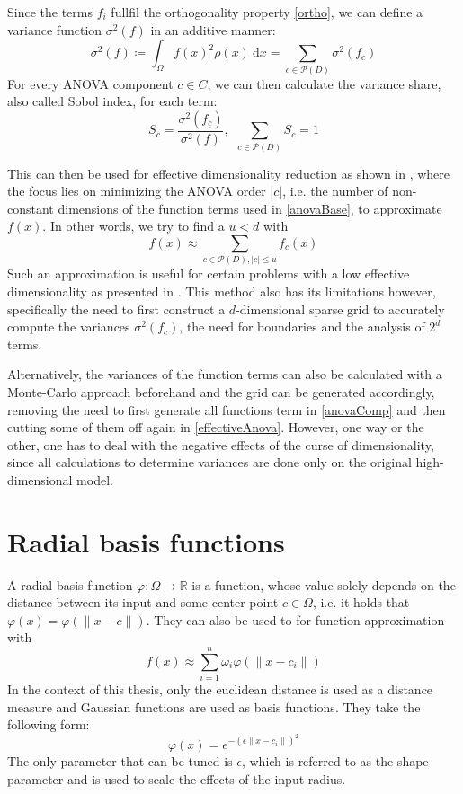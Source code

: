 \documentclass[
  a4paper,  %
  twoside,  %
  bibliography=totoc,
  headsepline,
  cleardoublepage=empty,
  parskip=half,
  draft=false
]{scrbook}
\begin{document}
Since the terms $f_i$ fullfil the orthogonality property \eqref{ortho}, we can define a variance function $\sigma^2(f)$ in an additive manner:
\begin{equation}
\sigma^2(f) \coloneqq \int_{\Omega} f(x)^2 \rho(x) ~ \text{d} x=\sum_{c \in \mathcal{P}(D)} \sigma^2(f_c)
\end{equation}
For every ANOVA component $c \in C$, we can then calculate the variance share, also called Sobol index, for each term:
\begin{equation}
S_{c}=\frac{\sigma^2(f_{\underline{c}} )}{\sigma^2(f)}, ~~ \sum_{c \in \mathcal{P}(D)} S_{c} = 1
\nonumber
\end{equation}

This can then be used for effective dimensionality reduction as shown in \cite{G13,F10}, where the focus lies on minimizing the ANOVA order $|c|$, i.e. the number of non-constant dimensions of the function terms used in \eqref{anovaBase}, to approximate $f(x)$.
In other words, we try to find a $u < d$ with
\begin{equation}
f(x) \approx \sum_{c \in \mathcal{P}(D), |c| \leq u} f_c(x)
\label{effectiveAnova}
\end{equation}
Such an approximation is useful for certain problems with a low effective dimensionality as presented in \cite{H08}.
This method also has its limitations however, specifically the need to first construct a $d$-dimensional sparse grid to accurately compute the variances $\sigma^2(f_c)$, the need for boundaries and the analysis of $2^d$ terms.

Alternatively, the variances of the function terms can also be calculated with a Monte-Carlo approach \cite{} beforehand and the grid can be generated accordingly, removing the need to first generate all functions term in \ref{anovaComp} and then cutting some of them off again in \ref{effectiveAnova}.
However, one way or the other, one has to deal with the negative effects of the curse of dimensionality, since all calculations to determine variances are done only on the original high-dimensional model.


\section{Radial basis functions}

A radial basis function $\varphi \colon \Omega \mapsto \mathds{R}$ is a function, whose value solely depends on the distance between its input and some center point $c \in \Omega$, i.e. it holds that $\varphi(x)=\varphi(\|x - c\|)$.
They can also be used to for function approximation with 
\begin{equation}
f(x) \approx \sum_{i=1}^n \omega_i \varphi(\|x - c_i\|)
\end{equation}
In the context of this thesis, only the euclidean distance is used as a distance measure and Gaussian functions \cite{} are used as basis functions.
They take the following form:
\begin{equation}
\varphi(x)=e^{-(\epsilon \|x - c_i\|)^2}
\end{equation}
The only parameter that can be tuned is $\epsilon$, which is referred to as the shape parameter and is used to scale the effects of the input radius.
\end{document}
